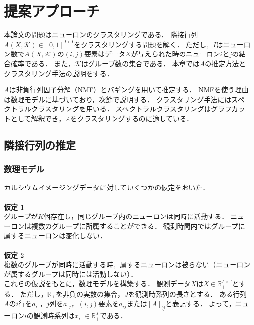 \chapter{提案アプローチ}
本論文の問題はニューロンのクラスタリングである．
隣接行列$\bar{A}(X, \mathcal{K}) \in [0, 1]^{I \times I}$をクラスタリングする問題を解く．
ただし，$I$はニューロン数で$\bar{A}(X, \mathcal{K})$の$(i,j)$要素はデータ$X$が与えられた時のニューロン$i$と$j$の結合確率である．
また，$\mathcal{K}$はグループ数の集合である．
本章では$\bar{A}$の推定方法とクラスタリング手法の説明をする．

$\bar{A}$は非負行列因子分解（NMF）とバギングを用いて推定する．
NMFを使う理由は数理モデルに基づいており，次節で説明する．
クラスタリング手法にはスペクトラルクラスタリングを用いる．
スペクトラルクラスタリングはグラフカットとして解釈でき，$\bar{A}$をクラスタリングするのに適している．

\section{隣接行列の推定}

\subsection{数理モデル}
カルシウムイメージングデータに対していくつかの仮定をおいた．
\\ \\
\noindent \textbf{仮定 1}\\
グループが$K$個存在し，同じグループ内のニューロンは同時に活動する．
ニューロンは複数のグループに所属することができる．
観測時間内ではグループに属するニューロンは変化しない．
\\ \\
\textbf{仮定 2}\\
複数のグループが同時に活動する時，属するニューロンは被らない（ニューロンが属するグループは同時には活動しない）．
\\

これらの仮説をもとに，数理モデルを構築する．
観測データ$X$は$X \in \mathbb{R}_+^{I \times J}$とする．
ただし，$\mathbb{R}_+$を非負の実数の集合，$J$を観測時系列の長さとする．
ある行列$A$の$i$行を$a_{i:}$，$j$列を$a_{:j}$，$(i,j)$要素を$a_{ij}$または$[A]_{ij}$と表記する．
よって，ニューロン$i$の観測時系列は$x_{i:} \in \mathbb{R}_+^{J}$である．


